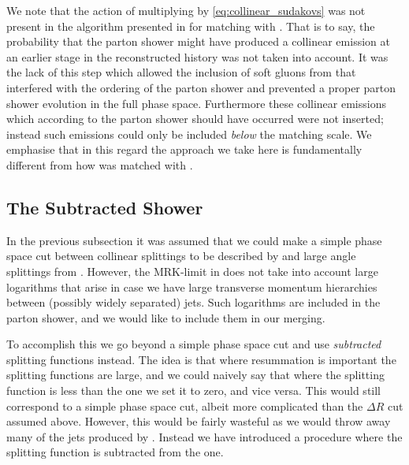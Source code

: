 We note that the action of multiplying by \cref{eq:collinear_sudakovs}
was not present in the algorithm presented in \cite{Andersen:2011zd}
for matching \HEJ with \ariadne. That is to say, the probability that
the parton shower might have produced a collinear emission at an
earlier stage in the reconstructed history was not taken into
account. It was the lack of this step which allowed the inclusion of
soft gluons from \HEJ that interfered with the ordering of the parton
shower and prevented a proper parton shower evolution in the full
phase space. Furthermore these collinear emissions which according to
the parton shower should have occurred were not inserted; instead such
emissions could only be included \textit{below} the matching scale.
We emphasise that in this regard the approach we take here is
fundamentally different from how \HEJ was matched with \ariadne.



\subsection{The Subtracted Shower}
\label{sec:subtracted}

%
In the previous subsection it was assumed that we could make a simple
phase space cut between collinear splittings to be described by \pyt
and large angle splittings from \HEJ. However, the MRK-limit in \HEJ
does not take into account large logarithms that arise in case we have
large transverse momentum hierarchies between (possibly widely
separated) jets. Such logarithms are included in the parton shower,
and we would like to include them in our merging.

To accomplish this we go beyond a simple phase space cut and use
\textit{subtracted} splitting functions instead. The idea is that
where resummation is important the splitting functions are large, and
we could naively say that where the \pyt splitting function is less
than the \HEJ one we set it to zero, and vice versa. This would still
correspond to a simple phase space cut, albeit more complicated than
the $\Delta R$ cut assumed above. However, this would be fairly
wasteful as we would throw away many of the jets produced by
\HEJ. Instead we have introduced a procedure where the \HEJ splitting
function is subtracted from the \pyt one.

